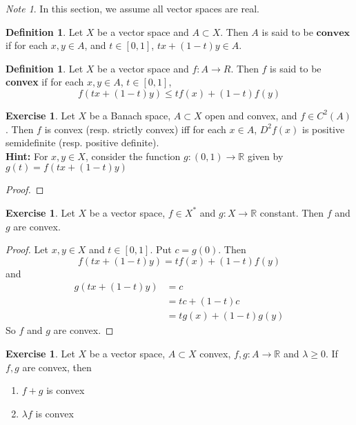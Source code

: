 \documentclass[12pt]{amsart}
\theoremstyle{definition}
\newtheorem{defn}[definition]{Definition}
\theoremstyle{remark}
\newtheorem{note}[remark]{Note}
\theoremstyle{definition}
\newtheorem{ex}[definition]{Exercise}
\newcommand{\lam}{\lambda}
\newcommand{\R}{\mathbb{R}}
\newcommand{\ui}{[0,1]}
\begin{document}
	\begin{note}
	In this section, we assume all vector spaces are real.
	\end{note}

	\begin{defn}
	Let $X$ be a vector space and $A \subset X$. Then $A$ is said to be $\textbf{convex}$ if for each $x, y \in A$, and $t \in [0,1]$,  $tx + (1-t)y \in A$. 
	\end{defn}	
	
	\begin{defn}
	Let $X$ be a vector space and $f:A \rightarrow R$. Then $f$ is said to be \textbf{convex} if for each $x,y \in A$, $t \in \ui$, $$f(tx + (1-t)y) \leq tf(x) + (1-t)f(y)$$
	\end{defn}
		
	\begin{ex}
	Let $X$ be a Banach space, $A \subset X$ open and convex, and $f \in C^2(A)$. Then $f$ is convex (resp. strictly convex) iff for each $x \in A$, $D^2f(x)$ is positive semidefinite (resp. positive definite).\\
	\textbf{Hint:} For $x,y \in X$, consider the function $g:(0,1) \rightarrow \R$ given by  $g(t) = f(tx + (1-t)y)$
	\end{ex}
	
	\begin{proof}
	
	\end{proof}
	
	\begin{ex}
	Let $X$ be a vector space, $f \in X^*$ and $g: X \rightarrow \R$ constant. Then $f$ and $g$ are convex. 
	\end{ex}
	
	\begin{proof}
		Let $x, y \in X$ and $t \in \ui$. Put $c = g(0)$. Then $$f(tx + (1-t)y) = tf(x) + (1-t)f(y)$$ and 
		\begin{align*}
		g(tx + (1-t)y) 
		&= c\\ 
		&= tc + (1-t)c \\
		&= tg(x) + (1-t)g(y)
		\end{align*}
		So $f$ and $g$ are convex.
	\end{proof}		
	
	\begin{ex}
	Let $X$ be a vector space, $A \subset X$ convex, $f,g:A \rightarrow \R$ and $\lam \geq 0$. If $f,g$ are convex, then 
	\begin{enumerate}
	\item $f + g$ is convex 
	\item $\lam f$ is convex
	\end{enumerate}
	\end{ex}
	
\end{document}
